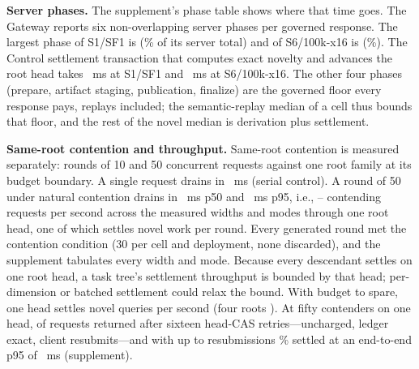 \documentclass[journal,onecolumn]{IEEEtran}
\newcommand{\code}[1]{\texttt{\detokenize{#1}}}
\begin{document}
\textbf{Server phases.} The supplement's phase table shows where that time goes. The Gateway
reports six non-overlapping server phases per governed response. The
largest phase of S1/SF1 is \texttt{\FinalVFivePublicationPhaseDominantSOneSFOne{}}
(\FinalVFivePublicationPhaseDominantSharePctSOneSFOne\% of its server total) and
of S6/100k-x16 is \texttt{\FinalVFivePublicationPhaseDominantSSixHundredKByteSixteen{}}
(\FinalVFivePublicationPhaseDominantSharePctSSixHundredKByteSixteen\%).
The Control settlement transaction that computes exact novelty and advances
the root head takes \FinalVFivePublicationPhaseSettlementMSSOneSFOne{}~ms at
S1/SF1 and \FinalVFivePublicationPhaseSettlementMSSSixHundredKByteSixteen{}~ms
at S6/100k-x16. The other four phases (prepare, artifact staging,
publication, finalize) are the governed floor every response pays,
replays included; the semantic-replay median of a cell thus bounds that
floor, and the rest of the novel median is derivation plus settlement.

\textbf{Same-root contention and throughput.} Same-root contention is measured separately: rounds of 10 and 50 concurrent
requests against one root family at its budget boundary. A single request
drains in \FinalVFivePublicationConcurrencySerialDrainPFiftyMS{}~ms (serial
control). A round of 50 under natural contention drains in
\FinalVFivePublicationConcurrencyFiftyNaturalDrainPFiftyMS{}~ms p50 and
\FinalVFivePublicationConcurrencyFiftyNaturalDrainPNinetyFiveMS{}~ms p95,
i.e., \FinalVFivePublicationConcurrencyFiftyNaturalRequestsPerSecond{}--\FinalVFivePublicationConcurrencyTenNaturalRequestsPerSecond{}
contending requests per second across the measured widths and modes through
one root head, one of which settles novel work per round. Every generated round met the contention condition (30
per cell and deployment, none discarded), and the supplement tabulates every
width and mode. Because every descendant settles on one root head, a task
tree's settlement throughput is bounded by that head; per-dimension or
batched settlement could relax the bound. With budget to spare, one head
settles \ThroughputOneRootFiftyDisjointNPS{} novel queries per second
(four roots \ThroughputFourRootFiftyDisjointNPS{}). At fifty contenders on
one head, \ThroughputOneRootFiftyRefused{} of
\ThroughputOneRootFiftyRequests{} requests returned \code{CONFLICT} after
sixteen head-CAS retries---uncharged, ledger exact, client resubmits---and
with up to \RetryK{} resubmissions \RetryOneRootFiftyCompletionPct\% settled
at an end-to-end p95 of \RetryOneRootFiftyDisjointEndToEndPNinetyFive{}~ms
(supplement).
\end{document}
